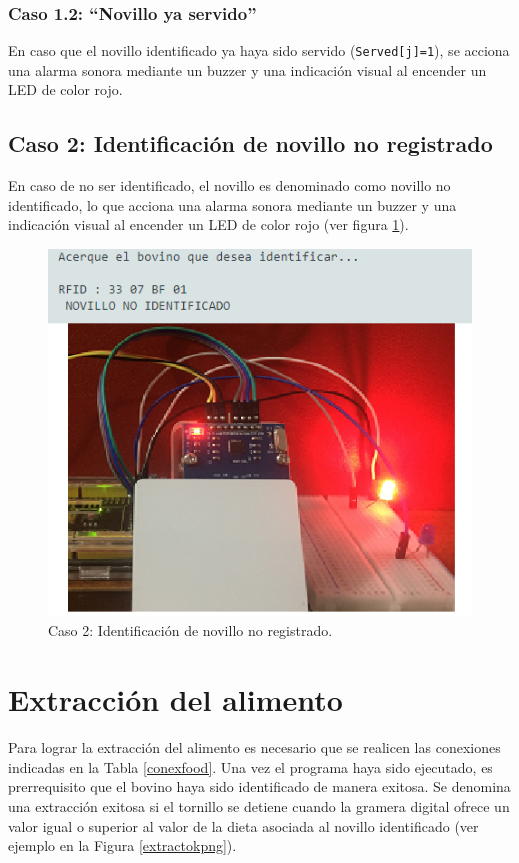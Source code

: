  \subsubsection{Caso 1.2: ``Novillo ya servido''} \label{idya}

En caso que el novillo identificado ya haya sido servido (\texttt{Served[j]=1}), se acciona una alarma sonora mediante un buzzer y una indicación visual al encender un LED de color rojo.

\subsection{Caso 2: Identificación de novillo no registrado}\label{idnpi}

 En caso de no ser identificado, el novillo es denominado como novillo no identificado, lo que acciona una alarma sonora mediante un buzzer y una indicación visual al encender un LED de color rojo (ver  figura \ref{idok2png}).
 
 \begin{figure}[H]
    \centering
    \includegraphics[scale=0.65]{img/idok2.png}
    \caption{Caso 2: Identificación de novillo no registrado.}
    \label{idok2png}
 \end{figure}
 

\section{Extracción del alimento}

Para lograr la extracción del alimento es necesario que se realicen las conexiones indicadas en la Tabla \ref{conexfood}. Una vez el programa haya sido ejecutado, es prerrequisito que el bovino haya sido identificado de manera exitosa. 
Se denomina una extracción exitosa si el tornillo se detiene cuando la gramera digital ofrece un valor igual o superior al valor de la dieta asociada al novillo identificado (ver ejemplo en la Figura \ref{extractokpng}).

